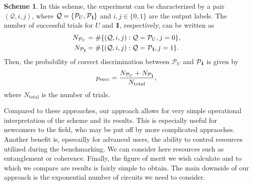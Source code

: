 \documentclass[preprint,12pt, a4paper, dvipsnames]{elsarticle}
\newcommand{\ket}[1]{\ensuremath{|#1\rangle}}
\newcommand{\bra}[1]{\ensuremath{\langle#1|}}
\newcommand{\ketbra}[2]{\ensuremath{\ket{#1}\bra{#2}}}
\newcommand{\proj}[1]{\ensuremath{\ketbra{#1}{#1}}}
\newcommand{\1}{{\rm 1\hspace{-0.9mm}l}}
\newcommand{\Id}{{\rm 1\hspace{-0.9mm}l}}
\newcommand{\PP}{\mathcal{P}}
\newcommand{\QQ}{\mathcal{Q}}
\theoremstyle{definition}
\newtheorem{scheme}{Scheme}
\begin{document}
\begin{scheme}
	In this scheme, the experiment can be characterized by a pair $(\mathcal{Q}, i,j)$, where
	$\mathcal{Q} = \{ \PP_{U}, \PP_{\Id} \}$ and $i,j \in \{0,1\}$ are the output labels. The number
	of successful trials for $U$ and $\Id$, respectively, can be written  as
	\begin{eqnarray}
	N_{\PP_U} &= \#\{(\mathcal{Q},  i, j): \mathcal{Q} = \PP_U, j = 0\}, \\
	N_{\PP_\Id} &= \#\{(\mathcal{Q},  i, j): \mathcal{Q} = \PP_\Id, j = 1\}.
	\end{eqnarray}
	Then, the probability of correct discrimination between $\PP_{U} $ and $\PP_\Id$ is given by
	\begin{equation}
	p_{\text{succ}} = \frac{N_{\PP_{U}} + N_{\PP_{\Id}}}{N_{\text{total}}},
	\end{equation}
	where $N_{\text{total}}$ is the number of trials.
\end{scheme}

Compared to these approaches, our approach allows for very simple operational
interpretation of the scheme and its results. This is especially useful for
newcomers to the field, who may be put off by more complicated appraoches.
Another benefit is, epsecailly for advanced users, the ability to control
resources utilized during the benchmarking. We can consider here resources such
as entanglement or coherence. Finally, the figure of merit we wish calculate and
to which we compare are results is fairly simple to obtain. The main downside of
our approach is the exponential number of circuits we need to consider.

\end{document}

